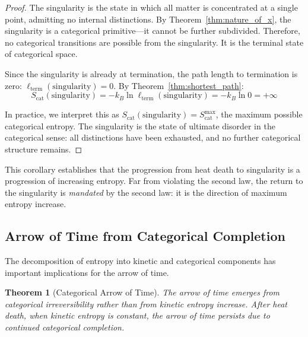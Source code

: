 \documentclass[12pt,a4paper]{article}
\newtheorem{theorem}{Theorem}[section]
\theoremstyle{definition}
\theoremstyle{remark}
\begin{document}
\begin{proof}
The singularity is the state in which all matter is concentrated at a single point, admitting no internal distinctions. By Theorem~\ref{thm:nature_of_x}, the singularity is a categorical primitive—it cannot be further subdivided. Therefore, no categorical transitions are possible from the singularity. It is the terminal state of categorical space.

Since the singularity is already at termination, the path length to termination is zero: $\ell_{\text{term}}(\text{singularity}) = 0$. By Theorem~\ref{thm:shortest_path}:
\begin{equation}
S_{\text{cat}}(\text{singularity}) = -k_B \ln \ell_{\text{term}}(\text{singularity}) = -k_B \ln 0 = +\infty
\end{equation}

In practice, we interpret this as $S_{\text{cat}}(\text{singularity}) = S_{\text{cat}}^{\max}$, the maximum possible categorical entropy. The singularity is the state of ultimate disorder in the categorical sense: all distinctions have been exhausted, and no further categorical structure remains.
\end{proof}

This corollary establishes that the progression from heat death to singularity is a progression of increasing entropy. Far from violating the second law, the return to the singularity is \emph{mandated} by the second law: it is the direction of maximum entropy increase.

\subsection{Arrow of Time from Categorical Completion}

The decomposition of entropy into kinetic and categorical components has important implications for the arrow of time.

\begin{theorem}[Categorical Arrow of Time]
\label{thm:arrow_of_time}
The arrow of time emerges from categorical irreversibility rather than from kinetic entropy increase. After heat death, when kinetic entropy is constant, the arrow of time persists due to continued categorical completion.
\end{theorem}
\end{document}
